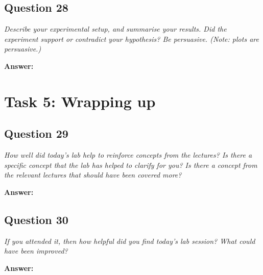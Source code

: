 \documentclass[a4paper]{article}
\begin{document}
\subsection*{Question 28}
\emph{Describe your experimental setup, and summarise your results.
Did the experiment support or contradict your hypothesis? Be persuasive. (Note: plots are persuasive.)}

\textbf{Answer:}

\section*{Task 5: Wrapping up}

\subsection*{Question 29}
\emph{How well did today's lab help to reinforce concepts from the
lectures? Is there a specific concept that the lab has helped to clarify for you? Is there a concept from the relevant lectures that should have been covered more?}

\textbf{Answer:}

\subsection*{Question 30}
\emph{If you attended it, then how helpful did you find today's lab
session? What could have been improved?}

\textbf{Answer:}
\end{document}
